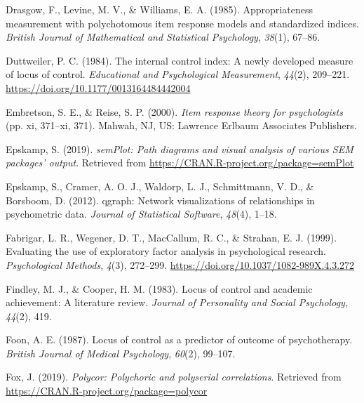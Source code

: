 \documentclass[
  english,
  man]{apa6}
\newlength{\cslhangindent}
\newlength{\cslentryspacingunit} %
\newenvironment{CSLReferences}[2] %
 {%
  \setlength{\parindent}{0pt}
  \ifodd #1
  \let\oldpar\par
  \def\par{\hangindent=\cslhangindent\oldpar}
  \fi
  \setlength{\parskip}{#2\cslentryspacingunit}
 }%
 {}
\begin{document}
\begin{CSLReferences}{1}{0}
\leavevmode{}%
Drasgow, F., Levine, M. V., \& Williams, E. A. (1985). Appropriateness measurement with polychotomous item response models and standardized indices. \emph{British Journal of Mathematical and Statistical Psychology}, \emph{38}(1), 67--86.

\leavevmode{}%
Duttweiler, P. C. (1984). The internal control index: A newly developed measure of locus of control. \emph{Educational and Psychological Measurement}, \emph{44}(2), 209--221. \url{https://doi.org/10.1177/0013164484442004}

\leavevmode{}%
Embretson, S. E., \& Reise, S. P. (2000). \emph{Item response theory for psychologists} (pp. xi, 371--xi, 371). Mahwah, NJ, US: Lawrence Erlbaum Associates Publishers.

\leavevmode{}%
Epskamp, S. (2019). \emph{semPlot: Path diagrams and visual analysis of various SEM packages' output}. Retrieved from \url{https://CRAN.R-project.org/package=semPlot}

\leavevmode{}%
Epskamp, S., Cramer, A. O. J., Waldorp, L. J., Schmittmann, V. D., \& Borsboom, D. (2012). {qgraph}: Network visualizations of relationships in psychometric data. \emph{Journal of Statistical Software}, \emph{48}(4), 1--18.

\leavevmode{}%
Fabrigar, L. R., Wegener, D. T., MacCallum, R. C., \& Strahan, E. J. (1999). Evaluating the use of exploratory factor analysis in psychological research. \emph{Psychological Methods}, \emph{4}(3), 272--299. \url{https://doi.org/10.1037/1082-989X.4.3.272}

\leavevmode{}%
Findley, M. J., \& Cooper, H. M. (1983). Locus of control and academic achievement: A literature review. \emph{Journal of Personality and Social Psychology}, \emph{44}(2), 419.

\leavevmode{}%
Foon, A. E. (1987). Locus of control as a predictor of outcome of psychotherapy. \emph{British Journal of Medical Psychology}, \emph{60}(2), 99--107.

\leavevmode{}%
Fox, J. (2019). \emph{Polycor: Polychoric and polyserial correlations}. Retrieved from \url{https://CRAN.R-project.org/package=polycor}


\end{CSLReferences}
\end{document}
